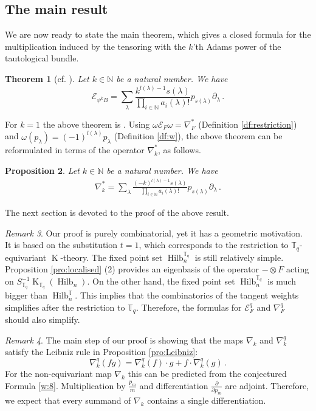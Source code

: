 \documentclass[12pt,a4paper]{amsart}
\theoremstyle{plain}
\newtheorem{tw}{Theorem}[section]
\newtheorem{pro}[tw]{Proposition}
\theoremstyle{definition}
\theoremstyle{remark}
\newtheorem{rem}[tw]{Remark}
\newcommand{\Hilb}[1]{\operatorname{Hilb}_{{#1}}}
\newcommand{\NN}{\mathbb{N}}
\newcommand{\TT}{\mathbb{T}}
\newcommand{\Tq}{{\mathbb{T}_q}}
\newcommand{\E}{\mathcal{E}}
\DeclareMathOperator{\KTh}{K}
\begin{document}
\subsection{The main result}
We are now ready to state the main theorem, which gives a closed formula for the multiplication induced by the tensoring with the $k$'th Adams power of the tautological bundle.

\begin{tw}[cf. {\cite[Conjecture 8.1]{Boissiere}}]
	\label{tw:main1}
	Let $k\in \NN$ be a natural number. We have
	$$
	\E_{\psi^kB}=\sum_{\lambda}\frac{k^{l(\lambda)-1}s(\lambda)}{\prod_{i\in\NN} a_i(\lambda)!} p_{s(\lambda)}\partial_{\lambda}\,.
	$$
\end{tw}
\noindent For $k=1$ the above theorem is \cite[Theorem 5.1]{Boissiere}.
Using  $\omega\E_{F}\omega=\nabla_F^*$ (Definition \ref{df:restriction}) and $\omega(p_\lambda)=(-1)^{l(\lambda)}p_\lambda$ (Definition \ref{df:w}), the above theorem can be reformulated in terms of the operator $\nabla_k^*$, as follows.  
\begin{pro} \label{pro:main1}
	Let $k\in \NN$ be a natural number. We have
	\begin{align} \label{w:8}
		\nabla_k^*=\sum_{\lambda}\frac{(-k)^{l(\lambda)-1}s(\lambda)}{\prod_{i\in\NN} a_i(\lambda)!} p_{s(\lambda)}\partial_{\lambda}\,.
	\end{align}
\end{pro}
The next section is devoted to the proof of the above result.
\begin{rem}
	Our proof is purely combinatorial, yet it has a geometric motivation. It is based on the substitution $t=1$, which corresponds to the restriction to $\Tq$-equivariant $\KTh$-theory. The fixed point set $\Hilb{n}^\Tq$ is still relatively simple. Proposition \ref{pro:localised} (2) provides an eigenbasis of the operator $-\otimes F$ acting on $S^{-1}_\Tq\KTh_\Tq(\Hilb{n})$. On the other hand, the fixed point set $\Hilb{n}^\Tq$ is much bigger than $\Hilb{n}^\TT$. This implies that the combinatorics of the tangent weights simplifies after the restriction to $\Tq$. 
	Therefore, the formulas for $\E^q_{F}$ and $\nabla_F^q$ should also simplify.  
\end{rem}
\begin{rem}
	The main step of our proof is showing that the maps $\nabla_k$ and $\nabla_k^q$ satisfy the Leibniz rule in Proposition \ref{pro:Leibniz}:
	$$\nabla_k^{q}(fg)=\nabla_k^{q}(f)\cdot g+f\cdot\nabla_k^{q}(g)\,. $$
	For the non-equivariant map $\nabla_k$ this can be predicted from the conjectured Formula \eqref{w:8}. Multiplication by $\frac{p_m}{m}$ and differentiation $\frac{\partial}{\partial p_m}$ are adjoint. Therefore, we expect that every summand of $\nabla_k$ contains a single differentiation.
\end{rem}
\end{document}
